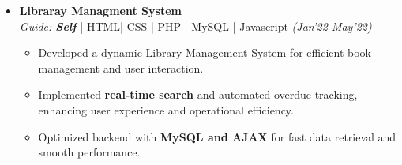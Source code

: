\documentclass[a4paper,10.5pt]{article}
\begin{document}
\begin{itemize}[noitemsep,nolistsep]
\item \textbf{Libraray Managment System}  \hfill {\emph{}}\\
\emph{Guide: \textbf{Self}} | HTML| CSS | PHP | MySQL | Javascript  \hfill
\emph{(Jan'22-May'22)}
\vspace{0.1cm}
\begin{itemize}[noitemsep,nolistsep]
    \item Developed a dynamic Library Management System for efficient book management and user interaction.
    \vspace{0.07cm}
    \item Implemented \textbf{real-time search} and automated overdue tracking, enhancing user experience and operational efficiency.
    \vspace{0.07cm}
    \item Optimized backend with \textbf{MySQL and AJAX} for fast data retrieval and smooth performance.


\end{itemize}
\vspace{0.15cm}


    

\end{itemize}
\end{document}
